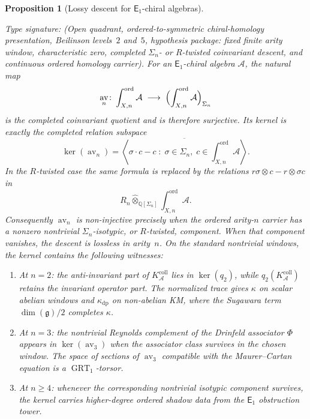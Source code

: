 \documentclass[11pt,reqno]{amsart}
\newtheorem{proposition}[theorem]{Proposition}
\theoremstyle{definition}
\theoremstyle{remark}
\newcommand{\cA}{\mathcal{A}}
\newcommand{\Eone}{\mathsf{E}_{1}}
\DeclareMathOperator{\av}{av}
\DeclareMathOperator{\GRT}{GRT}
\newcommand{\fg}{\mathfrak{g}}
\numberwithin{equation}{section}
\providecommand{\ClaimStatusProvedHere}{}
\begin{document}
\begin{proposition}[Lossy descent for $\Eone$-chiral algebras]
\label{prop:lossy-descent}
\ClaimStatusProvedHere
Type signature: \textup{(}Open quadrant, ordered-to-symmetric
chiral-homology presentation, Beilinson levels~$2$ and~$5$,
hypothesis package: fixed finite arity window, characteristic zero,
completed \(\Sigma_n\)- or \(R\)-twisted coinvariant descent, and
continuous ordered homology carrier\textup{)}.
For an $\Eone$-chiral algebra $\cA$, the natural map
\begin{equation}\label{eq:lossy}
  \av_n \colon
  \int_{X,n}^{\mathrm{ord}} \cA
  \;\longrightarrow\;
  \Bigl(\int_{X,n}^{\mathrm{ord}} \cA\Bigr)_{\Sigma_n}
\end{equation}
is the completed coinvariant quotient and is therefore surjective.
Its kernel is exactly the completed relation subspace
\[
\ker(\av_n)
=
\overline{
\left\langle \sigma\cdot c-c\;:\;
\sigma\in\Sigma_n,\;
c\in\int_{X,n}^{\mathrm{ord}}\cA
\right\rangle}.
\]
In the \(R\)-twisted case the same formula is replaced by the
relations \(r\sigma\otimes c-r\otimes\sigma c\) in
\[
R_n\widehat\otimes_{\mathbb Q[\Sigma_n]}
\int_{X,n}^{\mathrm{ord}}\cA .
\]
Consequently \(\av_n\) is non-injective precisely when the ordered
arity-\(n\) carrier has a nonzero nontrivial
\(\Sigma_n\)-isotypic, or \(R\)-twisted, component.  When that
component vanishes, the descent is lossless in arity~\(n\).  On the
standard nontrivial windows, the kernel contains the following
witnesses:
\begin{enumerate}[label=\textup{(\roman*)}]
\item At $n=2$: the anti-invariant part of
  $K_\cA^{\mathrm{coll}}$ lies in $\ker(q_2)$, while
  $q_2(K_\cA^{\mathrm{coll}})$ retains the invariant operator part.
  The normalized trace gives $\kappa$ on scalar abelian windows and
  $\kappa_{\mathrm{dp}}$ on non-abelian KM, where the Sugawara term
  $\dim(\fg)/2$ completes $\kappa$.
\item At $n = 3$: the nontrivial Reynolds complement of the
  Drinfeld associator $\Phi$ appears in $\ker(\av_3)$ when the
  associator class survives in the chosen window. The space of
  sections of $\av_3$ compatible with the Maurer--Cartan equation is
  a $\GRT_1$-torsor.
\item At $n \geq 4$: whenever the corresponding nontrivial
  isotypic component survives, the kernel carries higher-degree
  ordered shadow data from the $\Eone$ obstruction
  tower.
\end{enumerate}
\end{proposition}
\end{document}
